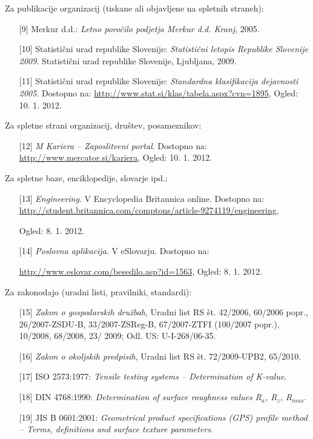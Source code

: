 Za publikacije organizacij (tiskane ali objavljene na spletnih straneh):
\begin{itemize}
\item[{[9]}] {Merkur d.d.}: \emph{Letno poročilo podjetja Merkur d.d. Kranj}, 2005.
\item[{[10]}] {Statistični urad republike Slovenije}: \emph{Statistični letopis Republike
  Slovenije 2009}. Statistični urad republike Slovenije, Ljubljana, 2009.
\item[{[11]}] {Statistični urad republike Slovenije}: \emph{Standardna klasifikacija
  dejavnosti 2005}. Dostopno na:
  \url{http://www.stat.si/klas/tabela.aspx?cvn=1895}, Ogled: 10. 1. 2012.
\end{itemize}

Za spletne strani organizacij, društev, posameznikov:
\begin{itemize}
\item[{[12]}] \emph{M Kariera – Zaposlitveni portal}. Dostopno na:
  \url{http://www.mercator.si/kariera}, Ogled: 10. 1. 2012.
\end{itemize}

Za spletne baze, enciklopedije, slovarje ipd.:
\begin{itemize}
\item[{[13]}] \emph{Engineering}. V Encyclopedia Britannica online. Dostopno na: \url{http://student.britannica.com/comptons/article-9274119/engineering},
  
  Ogled: 8. 1. 2012.
\item[{[14]}] \emph{Poslovna aplikacija}. V eSlovarju. Dostopno na:

  \url{http://www.eslovar.com/besedilo.asp?id=1563}, Ogled: 8. 1. 2012.
\end{itemize}

Za zakonodajo (uradni listi, pravilniki, standardi):
\begin{itemize}
\item[{[15]}] \emph{Zakon o gospodarskih družbah}, {U}radni list RS št. 42/2006, 60/2006
  popr., 26/2007-ZSDU-B, 
  33/2007-ZSReg-B, 67/2007-ZTFI (100/2007 popr.),
  10/2008, 68/2008, 23/ 2009; Odl. US: U-I-268/06-35.
\item[{[16]}] \emph{Zakon o okoljskih predpisih}, {U}radni list RS št. 72/2009-UPB2,
  65/2010.
\item[{[17]}] {ISO 2573:1977}: \emph{Tensile testing systems – Determination of K-value}.
\item[{[18]}] {DIN 4768:1990}: \emph{Determination of surface roughness values R$_a$, R$_z$,
  R$_{max}$}.
\item[{[19]}] {JIS B 0601:2001}: \emph{Geometrical product specifications (GPS) profile
  method – Terms, definitions and surface texture parameters}.
\end{itemize}

